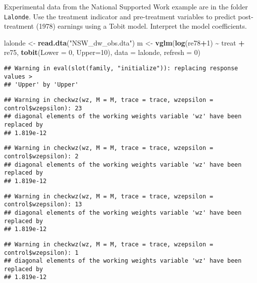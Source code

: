 \documentclass[
]{article}
\newenvironment{Shaded}{\begin{snugshade}}{\end{snugshade}}
\newcommand{\AttributeTok}[1]{\textcolor[rgb]{0.13,0.29,0.53}{#1}}
\newcommand{\DecValTok}[1]{\textcolor[rgb]{0.00,0.00,0.81}{#1}}
\newcommand{\FunctionTok}[1]{\textcolor[rgb]{0.13,0.29,0.53}{\textbf{#1}}}
\newcommand{\NormalTok}[1]{#1}
\newcommand{\OtherTok}[1]{\textcolor[rgb]{0.56,0.35,0.01}{#1}}
\newcommand{\SpecialCharTok}[1]{\textcolor[rgb]{0.81,0.36,0.00}{\textbf{#1}}}
\newcommand{\StringTok}[1]{\textcolor[rgb]{0.31,0.60,0.02}{#1}}
\begin{document}
Experimental data from the National Supported Work example are in the
folder \texttt{Lalonde}. Use the treatment indicator and pre-treatment
variables to predict post-treatment (1978) earnings using a Tobit model.
Interpret the model coefficients.

\begin{Shaded}
\begin{Highlighting}[]
\NormalTok{lalonde }\OtherTok{\textless{}{-}} \FunctionTok{read.dta}\NormalTok{(}\StringTok{"NSW\_dw\_obs.dta"}\NormalTok{)}
\NormalTok{m }\OtherTok{\textless{}{-}} \FunctionTok{vglm}\NormalTok{(}\FunctionTok{log}\NormalTok{(re78}\SpecialCharTok{+}\DecValTok{1}\NormalTok{) }\SpecialCharTok{\textasciitilde{}}\NormalTok{ treat }\SpecialCharTok{+}\NormalTok{ re75, }\FunctionTok{tobit}\NormalTok{(}\AttributeTok{Lower =} \DecValTok{0}\NormalTok{, }\AttributeTok{Upper=}\DecValTok{10}\NormalTok{), }\AttributeTok{data =}\NormalTok{ lalonde, }\AttributeTok{refresh =} \DecValTok{0}\NormalTok{)}
\end{Highlighting}
\end{Shaded}

\begin{verbatim}
## Warning in eval(slot(family, "initialize")): replacing response values >
## 'Upper' by 'Upper'
\end{verbatim}

\begin{verbatim}
## Warning in checkwz(wz, M = M, trace = trace, wzepsilon = control$wzepsilon): 23
## diagonal elements of the working weights variable 'wz' have been replaced by
## 1.819e-12
\end{verbatim}

\begin{verbatim}
## Warning in checkwz(wz, M = M, trace = trace, wzepsilon = control$wzepsilon): 2
## diagonal elements of the working weights variable 'wz' have been replaced by
## 1.819e-12
\end{verbatim}

\begin{verbatim}
## Warning in checkwz(wz, M = M, trace = trace, wzepsilon = control$wzepsilon): 13
## diagonal elements of the working weights variable 'wz' have been replaced by
## 1.819e-12
\end{verbatim}

\begin{verbatim}
## Warning in checkwz(wz, M = M, trace = trace, wzepsilon = control$wzepsilon): 1
## diagonal elements of the working weights variable 'wz' have been replaced by
## 1.819e-12
\end{verbatim}
\end{document}
